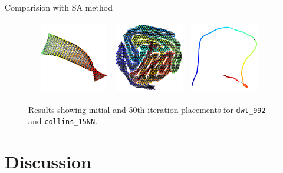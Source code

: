 \documentclass[dvipdfmx,13pt,aspectratio=169]{beamer}
\begin{document}
\begin{frame}{Comparision with SA method}
\begin{figure}[t]
\begin{tabular}{cccccc}
         & \includegraphics[width=0.15\columnwidth]{../main/circle/vis/dwt_992_CN-L-BFGS_50_last.png}
         & \includegraphics[width=0.15\columnwidth]{../main/circle/vis/collins_15NN_CN-L-BFGS_50_first.png}
         & \includegraphics[width=0.15\columnwidth]{../main/circle/vis/collins_15NN_CN-L-BFGS_50_last.png}                                                          \\
        \bottomrule
      \end{tabular}
      \caption{\small{Results showing initial and 50th iteration placements for \texttt{dwt\_992} and \texttt{collins\_15NN}.}}
      \label{fig:CN_vs_SA}
    \end{figure}
  \end{frame}
\fi

\section{Discussion}
\end{document}
